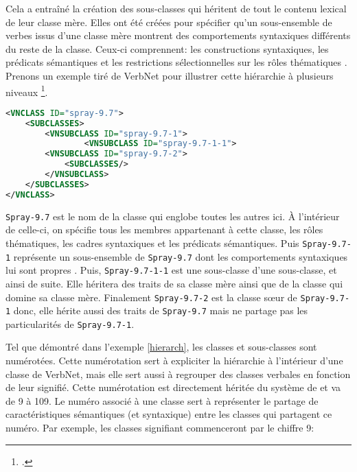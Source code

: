 Cela a entraîné la création des sous-classes qui héritent de tout le contenu lexical de leur classe mère. Elles ont été créées pour spécifier qu'un sous-ensemble de verbes issus d'une classe mère montrent des comportements syntaxiques différents du reste de la classe. Ceux-ci comprennent: les constructions syntaxiques, les prédicats sémantiques et les restrictions sélectionnelles sur les rôles thématiques \citep{SchulerVerbnetBroadcoverageComprehensive2005}. Prenons un exemple tiré de VerbNet pour illustrer cette hiérarchie à plusieurs niveaux \footcite{CLEARVerbNetAnnotationGuidelines}.

\begin{lstlisting}[language=XML, caption = Hiérarchie, label=hierarch]
<VNCLASS ID="spray-9.7">
    <SUBCLASSES>
        <VNSUBCLASS ID="spray-9.7-1">
                <VNSUBCLASS ID="spray-9.7-1-1">
        <VNSUBCLASS ID="spray-9.7-2">
            <SUBCLASSES/>
        </VNSUBCLASS>
    </SUBCLASSES>
</VNCLASS>
\end{lstlisting}

\texttt{Spray-9.7} est le nom de la classe qui englobe toutes les autres ici. À l'intérieur de celle-ci, on spécifie tous les membres appartenant à cette classe, les rôles thématiques, les cadres syntaxiques et les prédicats sémantiques. Puis \texttt{Spray-9.7-1} représente un sous-ensemble de \texttt{Spray-9.7} dont les comportements syntaxiques lui sont propres .  Puis, \texttt{Spray-9.7-1-1} est une sous-classe d'une sous-classe, et ainsi de suite. Elle héritera des traits de sa classe mère ainsi que de la classe qui domine sa classe mère. Finalement \texttt{Spray-9.7-2} est la classe sœur de \texttt{Spray-9.7-1} donc, elle hérite aussi des traits de \texttt{Spray-9.7} mais ne partage pas les particularités de \texttt{Spray-9.7-1}.

Tel que démontré dans l'exemple \ref{hierarch}, les classes et sous-classes sont numérotées. Cette numérotation sert à expliciter la hiérarchie à l'intérieur d'une classe de VerbNet, mais elle sert aussi à regrouper des classes verbales en fonction de leur signifié. Cette numérotation est directement héritée du système de \cite{verb-classes.levin.1993} et va de 9 à 109. Le numéro associé à une classe sert à représenter le partage de caractéristiques sémantiques (et syntaxique) entre les classes qui partagent ce numéro. Par exemple, les classes signifiant  commenceront par le chiffre 9:

